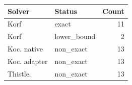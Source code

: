 \begin{tabular}{p{}p{}r}
\hline
Solver & Status & Count \\
\hline
Korf & exact & 11 \\
Korf & lower\_bound & 2 \\
Koc. native & non\_exact & 13 \\
Koc. adapter & non\_exact & 13 \\
Thistle. & non\_exact & 13 \\
\hline
\end{tabular}
